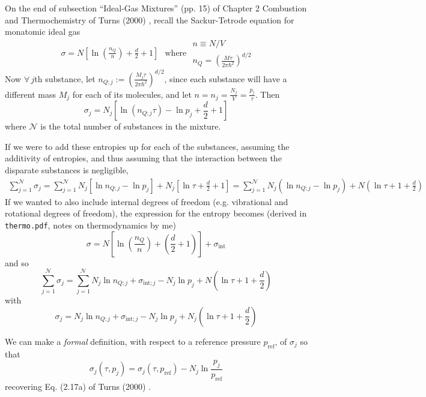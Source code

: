 \documentclass[10pt]{amsart}
\begin{document}
\begin{multicols*}{2}
On the end of subsection ``Ideal-Gas Mixtures'' (pp. 15) of Chapter 2 Combustion and Thermochemistry of Turns (2000) \cite{STurns2011}, recall the Sackur-Tetrode equation for monatomic ideal gas \cite{CKittelHKroemer1980} 
\[
\begin{gathered}
  \sigma = N \left[ \ln{ \left( \frac{n_Q}{n} \right) } + \frac{d}{2} + 1 \right]
\end{gathered} \text{ where } \begin{gathered}
  n \equiv N/V \\ 
  n_Q = \left( \frac{M\tau}{2\pi \hbar^2} \right)^{d/2}
\end{gathered}
\]
Now $\forall \, j$th substance, let $n_{Q;j} := \left( \frac{M_j \tau}{2\pi \hbar^2} \right)^{d/2}$, since each substance will have a different mass $M_j$ for each of its molecules, and let $n = n_j = \frac{N_j}{V} = \frac{p_j}{\tau}$.   Then
\[
\sigma_j = N_j \left[ \ln{(n_{Q;j} \tau )} - \ln{p_j} + \frac{d}{2} + 1 \right]
\]
where $\mathcal{N}$ is the total number of substances in the mixture.

If we were to add these entropies up for each of the substances, assuming the additivity of entropies, and thus assuming that the interaction between the disparate substances is negligible, 
\[
\begin{gathered}
  \sum_{j=1}^{\mathcal{N}} \sigma_j = \sum_{j=1}^{\mathcal{N}} N_j \left[ \ln{ n_{Q;j} } - \ln{p_j} \right] + N_j [ \ln{\tau} + \frac{d}{2} + 1 ]  = \sum_{j=1}^{\mathcal{N}} N_j( \ln{ n_{Q;j} }- \ln{p_j} )  + N ( \ln{\tau} + 1 + \frac{d}{2}  ) 
\end{gathered}
\]
If we wanted to also include internal degrees of freedom (e.g. vibrational and rotational degrees of freedom), the expression for the entropy becomes (derived in \verb|thermo.pdf|, notes on thermodynamics by me)
\[
  \sigma = N \left[ \ln{ \left( \frac{n_Q}{n} \right) } + \left( \frac{d}{2} + 1 \right) \right] + \sigma_{\text{int}}
\]
and so 
\[
\sum_{j=1}^{\mathcal{N}} \sigma_j = \sum_{j=1}^{\mathcal{N}} N_j \ln{ n_{Q;j} } + \sigma_{\text{int};j} - N_j\ln{p_j}   + N ( \ln{\tau} + 1 + \frac{d}{2}  ) 
\]
with
\[
\sigma_j = N_j \ln{n_{Q;j}} + \sigma_{\text{int};j} - N_j \ln{p_j} + N_j (\ln{\tau} + 1 + \frac{d}{2})
\]

We can make a \emph{formal} definition, with respect to a reference pressure $p_{\text{ref}}$, of $\sigma_j$ so that 
\begin{equation}
  \sigma_j(\tau,p_j) = \sigma_j(\tau,p_{\text{ref}}) - N_j \ln{ \frac{p_j}{p_{\text{ref}}} }
\end{equation}
recovering Eq. (2.17a) of Turns (2000) \cite{STurns2011}.  








\end{multicols*}
\end{document}
